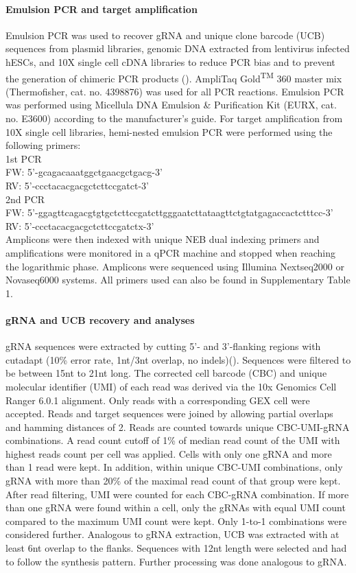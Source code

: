 \paragraph{Emulsion PCR and target amplification}
Emulsion PCR was used to recover gRNA and unique clone barcode (UCB) sequences from plasmid libraries, genomic DNA extracted from lentivirus infected hESCs, and 10X single cell cDNA libraries to reduce PCR bias and to prevent the generation of chimeric PCR products (\cite{omelina_optimized_2019,williams_amplification_2006}). AmpliTaq Gold\textsuperscript{TM} 360 master mix (Thermofisher, cat. no. 4398876) was used for all PCR reactions. Emulsion PCR was performed using Micellula DNA Emulsion \& Purification Kit (EURX, cat. no. E3600) according to the manufacturer's guide. For target amplification from 10X single cell libraries, hemi-nested emulsion PCR were performed using the following primers: \\
1st PCR \\
FW: 5'-gcagacaaatggctgaacgctgacg-3' \\
RV: 5'-ccctacacgacgctcttccgatct-3' \\
2nd PCR \\
FW: 5'-ggagttcagacgtgtgctcttccgatcttgggaatcttataagttctgtatgagaccactctttcc-3' \\
RV: 5'-ccctacacgacgctcttccgatctx-3' \\
Amplicons were then indexed with unique NEB dual indexing primers and amplifications were monitored in a qPCR machine and stopped when reaching the logarithmic phase. Amplicons were sequenced using Illumina Nextseq2000 or Novaseq6000 systems. All primers used can also be found in Supplementary Table 1. 

\paragraph{gRNA and UCB recovery and analyses}
gRNA sequences were extracted by cutting 5'- and 3'-flanking regions with cutadapt (10\% error rate, 1nt/3nt overlap, no indels)(\cite{martin_cutadapt_2011}). Sequences were filtered to be between 15nt to 21nt long. The corrected cell barcode (CBC) and unique molecular identifier (UMI) of each read was derived via the 10x Genomics Cell Ranger 6.0.1 alignment. Only reads with a corresponding GEX cell were accepted. Reads and target sequences were joined by allowing partial overlaps and hamming distances of 2. Reads are counted towards unique CBC-UMI-gRNA combinations. A read count cutoff of 1\% of median read count of the UMI with highest reads count per cell was applied. Cells with only one gRNA and more than 1 read were kept. In addition, within unique CBC-UMI combinations, only gRNA with more than 20\% of the maximal read count of that group were kept. After read filtering, UMI were counted for each CBC-gRNA combination. If more than one gRNA were found within a cell, only the gRNAs with equal UMI count compared to the maximum UMI count were kept. Only 1-to-1 combinations were considered further. Analogous to gRNA extraction, UCB was extracted with at least 6nt overlap to the flanks. Sequences with 12nt length were selected and had to follow the synthesis pattern. Further processing was done analogous to gRNA.


